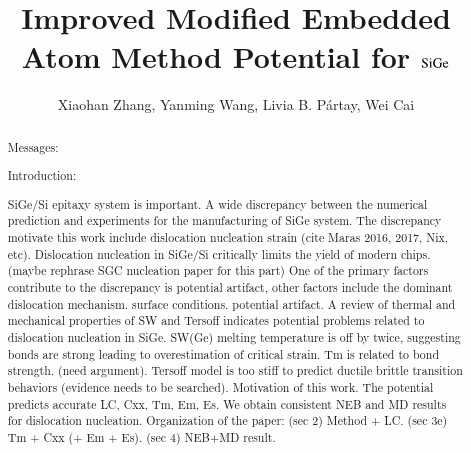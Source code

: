 \documentclass[review]{elsarticle}
\begin{document}
\begin{frontmatter}

\title{Improved Modified Embedded Atom Method Potential for $\rm SiGe$}

\author{Xiaohan Zhang, Yanming Wang,  Livia  B. P\'artay, Wei Cai}%



\address[mymainaddress]{Department of Mechanical Engineering, Stanford University\\Department of Materials Science and Engineering, Massachusetts Institute of Technology\\Department of Chemistry, University of Reading, Reading, UK}

\begin{abstract}


\iffalse

Messages:
%

Introduction:
%

SiGe/Si epitaxy system is important. 
%
A wide discrepancy between the numerical prediction and experiments for the manufacturing of SiGe system. The discrepancy motivate this work include dislocation nucleation strain (cite Maras 2016, 2017, Nix, etc).
%
Dislocation nucleation in SiGe/Si critically limits the yield of modern chips. 
(maybe rephrase SGC nucleation paper for this part)
%
One of the primary factors contribute to the discrepancy is potential artifact, other factors include the dominant dislocation mechanism. surface conditions. potential artifact. 
%
A review of thermal and mechanical properties of SW and Tersoff indicates potential problems related to dislocation nucleation in SiGe.  SW(Ge) melting temperature is off by twice, suggesting bonds are strong leading to overestimation of critical strain. Tm is related to bond strength. (need argument). Tersoff model is too stiff to predict ductile brittle transition behaviors (evidence needs to be searched). Motivation of this work.
%
The potential predicts accurate LC, Cxx, Tm, Em, Es.
%
We obtain consistent NEB and MD results for dislocation nucleation.
%
Organization of the paper: (sec 2) Method + LC. (sec 3e) Tm + Cxx (+ Em + Es). (sec 4) NEB+MD result. 
%


\end{abstract}
\end{frontmatter}
\end{document}

